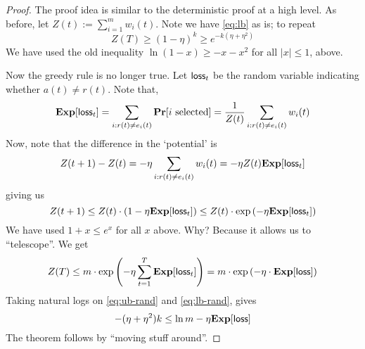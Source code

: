 \documentclass[11pt]{article}
\begin{document}
\begin{proof}
	The proof idea is similar to the deterministic proof at a high level. As before, let $Z(t) := \sum_{i=1}^m w_i(t)$. Note we have \eqref{eq:lb} as is; to repeat
	\begin{equation}\label{eq:lb-rand}
	Z(T) \geq (1 - \eta)^k \geq e^{-k(\eta + \eta^2)}
	\end{equation}
	We have used the old inequality $\ln(1-x)\ge -x-x^2$ for all $|x|\leq 1$, above.
	
	Now the greedy rule is no longer true.  Let $\mathsf{loss}_t$ be the random variable indicating whether $a(t) \neq r(t)$. Note that,
	\begin{equation}
	\label{eq:exploss}
	\mathbf{Exp}[\mathsf{loss}_t] = \sum_{i: r(t) \neq e_i(t)} \mathbf{Pr}[i ~\textrm{selected}] = \frac{1}{Z(t)} \sum_{i: r(t) \neq e_i(t)} w_i(t)
	\end{equation}
	Now, note that the difference in the `potential' is
	\[
	Z(t+1) - Z(t) = -\eta \sum_{i: r(t) \neq e_i(t)} w_i(t) = -\eta Z(t)\mathbf{Exp}[\mathsf{loss}_t]
	\]
	giving us
	\[
	Z(t+1) \leq Z(t)\cdot\left(1 - \eta \mathbf{Exp}[\mathsf{loss}_t] \right) \leq Z(t)\cdot \exp\left(-\eta \mathbf{Exp}[\mathsf{loss}_t]\right)
	\]
	We have used $1+x\leq e^x$ for all $x$ above. Why? Because it allows us to ``telescope''.
	We  get
	\begin{equation}\label{eq:ub-rand}
	Z(T) \leq m\cdot \exp\left(-\eta \sum_{t=1}^T \mathbf{Exp}[\mathsf{loss}_t]\right) = m\cdot \exp\left(-\eta\cdot\mathbf{Exp}[\mathsf{loss}]\right)
	\end{equation}
	Taking natural logs on \eqref{eq:ub-rand} and \eqref{eq:lb-rand}, gives
	\[
	-(\eta + \eta^2)k \leq \ln m - \eta \mathbf{Exp}[\mathsf{loss}]
	\]
	The theorem follows by ``moving stuff around''.
\end{proof}
\end{document}
